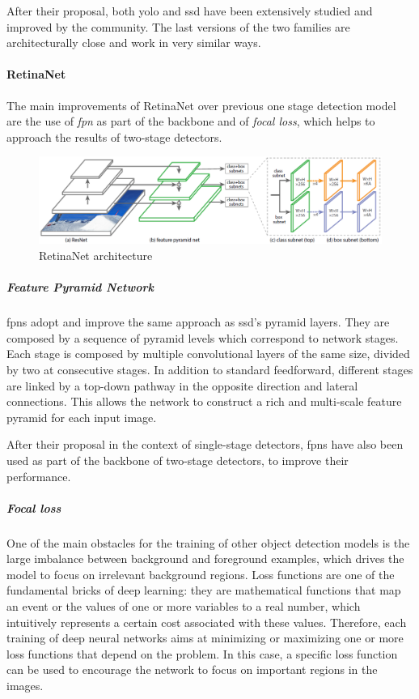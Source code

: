 \documentclass[%
    corpo=12pt,
    twoside,
    stile=classica,   
    tipotesi=magistrale,
    evenboxes,
    english,
	numerazioneromana,
]{toptesi}
\begin{document}
After their proposal, both \gls{yolo} and \gls{ssd} have been extensively studied and improved by the community. The last versions of the two families are architecturally close and work in very similar ways.

\paragraph{RetinaNet}
The main improvements of RetinaNet\cite{lin2018focal} over previous one stage detection model are the use of \textit{\acrfull{fpn}} as part of the backbone and of \textit{focal loss}, which helps to approach the results of two-stage detectors.

\begin{figure}[ht!]
	\centering
	\includegraphics[width=0.8\linewidth]{imgs/retinanet.png}
	\caption{RetinaNet architecture\cite{lin2018focal}}
	\label{fig:retinanet}
\end{figure}

\subparagraph{Feature Pyramid Network}
\glspl{fpn}\cite{lin2017feature} adopt and improve the same approach as \acrshort{ssd}'s pyramid layers. They are composed by a sequence of pyramid levels which correspond to network stages. Each stage is composed by multiple convolutional layers of the same size, divided by two at consecutive stages. In addition to standard feedforward, different stages are linked by a top-down pathway in the opposite direction and lateral connections. This allows the network to construct a rich and multi-scale feature pyramid for each input image.

After their proposal in the context of single-stage detectors, \glspl{fpn} have also been used as part of the backbone of two-stage detectors, to improve their performance.

\subparagraph{Focal loss}
One of the main obstacles for the training of other object detection models is the large imbalance between background and foreground examples, which drives the model to focus on irrelevant background regions. Loss functions are one of the fundamental bricks of deep learning: they are mathematical functions that map an event or the values of one or more variables to a real number, which intuitively represents a certain cost associated with these values. Therefore, each training of deep neural networks aims at minimizing or maximizing one or more loss functions that depend on the problem. In this case, a specific loss function can be used to encourage the network to focus on important regions in the images.
\end{document}
